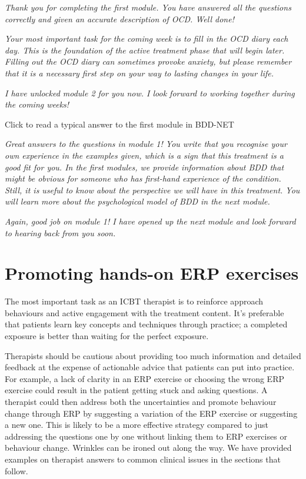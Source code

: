 \documentclass[]{book}
\theoremstyle{definition}
\theoremstyle{definition}
\theoremstyle{definition}
\theoremstyle{remark}
\begin{document}
\emph{Thank you for completing the first module. You have answered all
the questions correctly and given an accurate description of OCD. Well
done!}

\emph{Your most important task for the coming week is to fill in the OCD
diary each day. This is the foundation of the active treatment phase
that will begin later. Filling out the OCD diary can sometimes provoke
anxiety, but please remember that it is a necessary first step on your
way to lasting changes in your life.}

\emph{I have unlocked module 2 for you now. I look forward to working
together during the coming weeks!}

 Click to read a typical answer to the first module in BDD-NET

\emph{Great answers to the questions in module 1! You write that you
recognise your own experience in the examples given, which is a sign
that this treatment is a good fit for you. In the first modules, we
provide information about BDD that might be obvious for someone who has
first-hand experience of the condition. Still, it is useful to know
about the perspective we will have in this treatment. You will learn
more about the psychological model of BDD in the next module.}

\emph{Again, good job on module 1! I have opened up the next module and
look forward to hearing back from you soon.}

\hypertarget{promoting-hands-on-erp-exercises}{%
\section{Promoting hands-on ERP
exercises}\label{promoting-hands-on-erp-exercises}}

The most important task as an ICBT therapist is to reinforce approach
behaviours and active engagement with the treatment content. It's
preferable that patients learn key concepts and techniques through
practice; a completed exposure is better than waiting for the perfect
exposure.

Therapists should be cautious about providing too much information and
detailed feedback at the expense of actionable advice that patients can
put into practice. For example, a lack of clarity in an ERP exercise or
choosing the wrong ERP exercise could result in the patient getting
stuck and asking questions. A therapist could then address both the
uncertainties and promote behaviour change through ERP by suggesting a
variation of the ERP exercise or suggesting a new one. This is likely to
be a more effective strategy compared to just addressing the questions
one by one without linking them to ERP exercises or behaviour change.
Wrinkles can be ironed out along the way. We have provided examples on
therapist answers to common clinical issues in the sections that follow.
\end{document}
